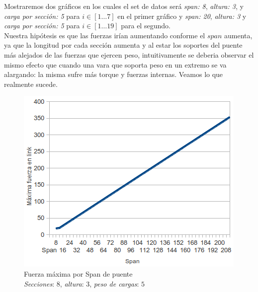 Mostraremos dos gráficos en los cuales el set de datos será \textit{span: 8},
\textit{altura: 3}, y \textit{carga por sección: 5} para $i \in [1 \dots 7]$ en el primer gráfico y
\textit{span: 20}, \textit{altura: 3} y \textit{carga por sección: 5} para $i \in [1 \dots 19]$ para el segundo.\\

Nuestra hipótesis es que las fuerzas irían aumentando conforme el $span$
 aumenta, ya que la longitud por cada sección aumenta y al estar los soportes del puente más alejados de las fuerzas que ejercen peso, intuitivamente se deberia observar el mismo efecto que cuando una vara que soporta peso en un extremo se va alargando: la misma sufre más torque y fuerzas internas. Veamos lo que realmente sucede.\\

\begin{figure}[h!]
	\begin{center}
	\includegraphics[scale=0.8]{archivos/graficos/Fuerza-x-span.png}
	\caption{\label{fig:fuerza_x_span}Fuerza máxima por Span de puente\\  \textit{Secciones}: $8$, \textit{altura}: $3$, \textit{peso de cargas}: $5$}
	\end{center}
\end{figure}

